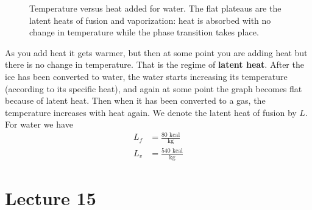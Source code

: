 \documentclass{report}
\numberwithin{equation}{section}
\begin{document}
\begin{figure}[H]
\centering
{}
\caption{Temperature versus heat added for water. The flat plateaus are the
latent heats of fusion and vaporization: heat is absorbed with no change in
temperature while the phase transition takes place.}
\label{fig:phase_transitions}
\end{figure}

\noindent As you add heat it gets warmer, but then at some point you are adding heat but there is no change in temperature. That is the regime of \textbf{latent heat}.
After the ice has been converted to water, the water starts increasing its temperature (according to its specific heat), and again at some point the graph becomes flat
because of latent heat. Then when it has been converted to a gas, the temperature increases with heat again. We denote the latent heat of fusion by $L$. For water we have
\begin{align*}
    L_f &= \frac{80\text{ kcal}}{\text{kg}}\\
    L_v &= \frac{540\text{ kcal}}{\text{kg}}
\end{align*}
\section{Lecture 15}
\end{document}
